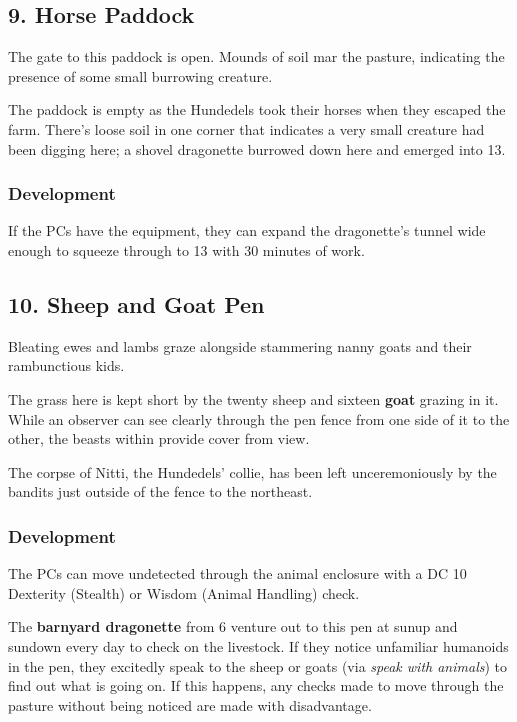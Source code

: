 \documentclass[10pt,a4paper,twoside,bg=print,twocolumn,openany,nodeprecatedcode]{dndbook}
\begin{document}
\subsection{9. Horse Paddock}
\begin{DndReadAloud}{}
The gate to this paddock is open. Mounds of soil mar the pasture, indicating the presence of some small burrowing creature.

\end{DndReadAloud}

The paddock is empty as the Hundedels took their horses when they escaped the farm. There's loose soil in one corner that indicates a very small creature had been digging here; a shovel dragonette burrowed down here and emerged into 13.

\subsubsection{Development}
If the PCs have the equipment, they can expand the dragonette's tunnel wide enough to squeeze through to 13 with 30 minutes of work.

\subsection{10. Sheep and Goat Pen}
\begin{DndReadAloud}{}
Bleating ewes and lambs graze alongside stammering nanny goats and their rambunctious kids.

\end{DndReadAloud}

The grass here is kept short by the twenty sheep and sixteen \textbf{goat} grazing in it. While an observer can see clearly through the pen fence from one side of it to the other, the beasts within provide cover from view.

The corpse of Nitti, the Hundedels' collie, has been left unceremoniously by the bandits just outside of the fence to the northeast.

\subsubsection{Development}
The PCs can move undetected through the animal enclosure with a DC 10 Dexterity (Stealth) or Wisdom (Animal Handling) check.

The \textbf{barnyard dragonette} from 6 venture out to this pen at sunup and sundown every day to check on the livestock. If they notice unfamiliar humanoids in the pen, they excitedly speak to the sheep or goats (via \textit{speak with animals}) to find out what is going on. If this happens, any checks made to move through the pasture without being noticed are made with disadvantage.
\end{document}
